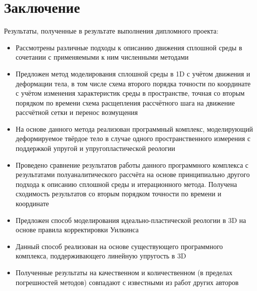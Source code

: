 \section{Заключение}
Результаты, полученные в результате выполнения дипломного проекта:
\begin{itemize}
\item Рассмотрены различные подходы к описанию движения сплошной среды в сочетании с применяемыми к ним численными методами
\item Предложен метод моделирования сплошной среды в 1D с учётом движения и деформации тела, в том числе схема второго порядка точности по координате с учётом изменения характеристик среды в пространстве, точная со вторым порядком по времени схема расщепления рассчётного шага на движение рассчётной сетки и перенос возмущения
\item На основе данного метода реализован программный комплекс, моделирующий деформируемое твёрдое тело в случае одного пространственного измерения с поддержкой упругой и упругопластической реологии
\item Проведено сравнение результатов работы данного программного комплекса с результатами полуаналитического рассчёта на основе принципиально другого подхода к описанию сплошной среды и итерационного  метода. Получена сходимость результатов со вторым порядком точности по времени и координате
\item Предложен способ моделирования идеально-пластической реологии в 3D на основе правила корректировки Уилкинса
\item Данный способ реализован на основе существующего программного комплекса, поддерживающего линейную упругость в 3D
\item Полученные результаты на качественном и количественном (в пределах погрешностей методов) совпадают с известными из работ других авторов 
\end{itemize}
